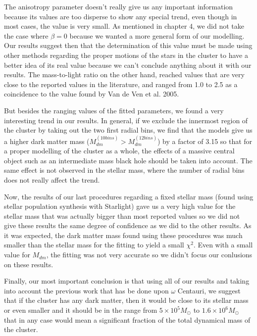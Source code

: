 The anisotropy parameter doesn't really give us any important information because its values are too disperse to show any special trend, even though in most cases, the value is very small. As mentioned in chapter 4, we did not take the case where $\beta = 0$ because we wanted a more general form of our modelling. Our results suggest then that the determination of this value must be made using other methods regarding the proper motions of the stars in the cluster to have a better idea of its real value because we can't conclude anything about it with our results. The mass-to-light ratio on the other hand, reached values that are very close to the reported values in the literature, and ranged from 1.0 to 2.5 as a coincidence to the value found by Van de Ven et al. 2005.

But besides the ranging values of the fitted parameters, we found a very interesting trend in our results. In general, if we exclude the innermost region of the cluster by taking out the two first radial bins, we find that the models give us a higher dark matter mass ($M_{dm}^{(10 bins)}>M_{dm}^{(12 bins)}$) by a factor of 3.15 so that for a proper modelling of the cluster as a whole, the effects of a massive central object such as an intermediate mass black hole should be taken into account. The same effect is not observed in the stellar mass, where the number of radial bins does not really affect the trend.

Now, the results of our last procedures regarding a fixed stellar mass (found using stellar population synthesis with Starlight) gave us a very high value for the stellar mass that was actually bigger than most reported values so we did not give these results the same degree of confidence as we did to the other results. As it was expected, the dark matter mass found using these procedures was much smaller than the stellar mass for the fitting to yield a small $\chi^{2}$. Even with a small value for $M_{dm}$, the fitting was not very accurate so we didn't focus our conlusions on these results.

Finally, our most important conclusion is that using all of our results and taking into account the previous work that has be done upon $\omega$ Centauri, we suggest that if the cluster has any dark matter, then it would be close to its stellar mass or even smaller and it should be in the range from $5 \times 10^{5} M_{\odot}$ to $1.6 \times 10^{6} M_{\odot}$ that in any case would mean a significant fraction of the total dynamical mass of the cluster. 

